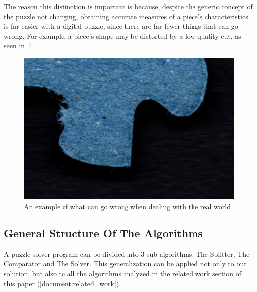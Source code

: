 \documentclass{article}
\begin{document}
The reason this distinction is important is because,
despite the generic concept of the puzzle not changing,
obtaining accurate measures of a piece's characteristics
is far easier with a digital puzzle,
since there are far fewer things that can go wrong.
For example, a piece's shape may be distorted by
a low-quality cut, as seen in~\cref{fig:figure_measurement_error}

\begin{figure}[H]
    \caption{An example of what can go wrong when dealing with the real world}\label{fig:figure_measurement_error}
    \includegraphics[height=0.25\textwidth]{pictures/example_bad_piece.jpg}
    \centering
\end{figure}

\subsection{General Structure Of The Algorithms}

A puzzle solver program can be divided into 3 sub algorithms,
The Splitter, The Comparator and The Solver.
This generalization can be applied not only to our solution,
but also to all the algorithms analyzed in the related
work section of this paper (\cref{document:related_work}).
\end{document}
